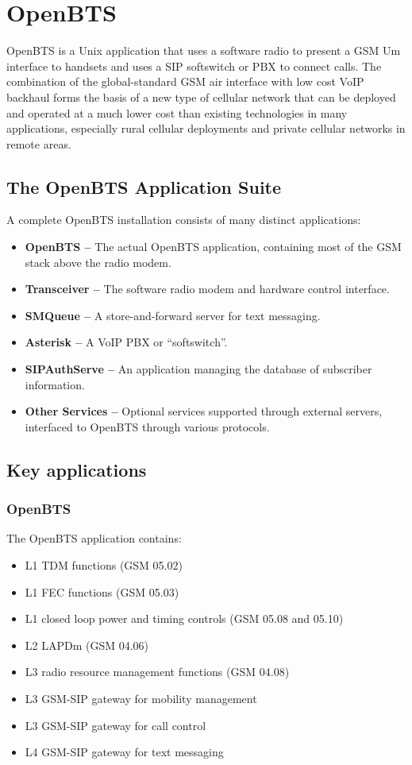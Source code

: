 \chapter{OpenBTS}

OpenBTS is a Unix application that uses a software radio to present a GSM Um interface 
to handsets and uses a SIP softswitch or PBX to connect calls.
The combination of the global-standard GSM air interface with low cost VoIP backhaul 
forms the basis of a new type of cellular network that can be deployed and operated at a much lower
cost than existing technologies in many applications, 
especially rural cellular deployments and private cellular networks in remote areas.

\section{The OpenBTS Application Suite}
A complete OpenBTS installation consists of many distinct applications:

\begin{itemize}
\item \textbf{OpenBTS --} The actual OpenBTS application, containing most of
the GSM stack above the radio modem.
\item \textbf{Transceiver --} The software radio modem and hardware control interface.
\item \textbf{SMQueue --} A store-and-forward server for text messaging.
\item \textbf{Asterisk --} A VoIP PBX or ``softswitch''.
\item \textbf{SIPAuthServe --} An application managing the database of subscriber information.
\item \textbf{Other Services --} Optional services supported through 
external servers, interfaced to OpenBTS through various protocols.
\end{itemize}

\section{Key applications}
\subsection{OpenBTS}
The OpenBTS application contains:
\begin{itemize}
\item L1 TDM functions (GSM 05.02)
\item L1 FEC functions (GSM 05.03)
\item L1 closed loop power and timing controls (GSM 05.08 and 05.10)
\item L2 LAPDm (GSM 04.06)
\item L3 radio resource management functions (GSM 04.08)
\item L3 GSM-SIP gateway for mobility management
\item L3 GSM-SIP gateway for call control
\item L4 GSM-SIP gateway for text messaging
\end{itemize}


